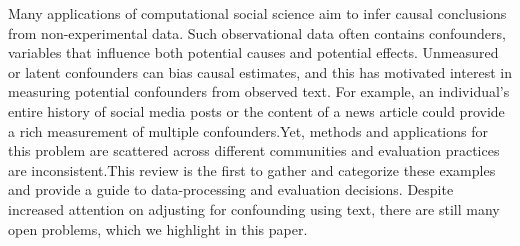 Many applications of computational social science aim to infer causal conclusions from non-experimental data. Such observational data often contains confounders, variables that influence both potential causes and potential effects. Unmeasured or latent confounders can bias causal estimates, and this has motivated interest in measuring potential confounders from observed text. For example, an individual's entire history of social media posts or the content of a news article could provide a rich measurement of multiple confounders.Yet, methods and applications for this problem are scattered across different communities and evaluation practices are inconsistent.This review is the first to gather and categorize these examples and provide a guide to data-processing and evaluation decisions. Despite increased attention on adjusting for confounding using text, there are still many open problems, which we highlight in this paper.
